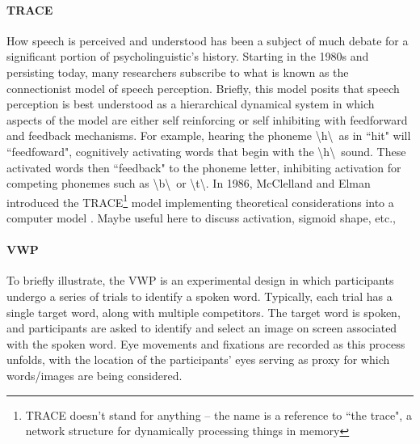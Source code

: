 \documentclass{article}
\begin{document}
\paragraph{TRACE } How speech is perceived and understood has been a subject of much debate for a significant portion of psycholinguistic's history. Starting in the 1980s and persisting today, many researchers subscribe to what is known as the connectionist model of speech perception. Briefly, this model posits that speech perception is best understood as a hierarchical dynamical system in which aspects of the model are either self reinforcing or self inhibiting with feedforward and feedback mechanisms. For example, hearing the phoneme \textbackslash h\textbackslash  \ as in ``hit" will ``feedfoward", cognitively activating words that begin with the \textbackslash h\textbackslash \  sound. These activated words then ``feedback" to the phoneme letter, inhibiting activation for competing phonemes such as \textbackslash b\textbackslash \ or \textbackslash t\textbackslash. In 1986, McClelland and Elman introduced the TRACE\footnote{TRACE doesn't stand for anything -- the name is a reference to ``the trace", a network structure for dynamically processing things in memory} model implementing theoretical considerations into a computer model \cite{elman1985speech}. Maybe useful here to discuss activation, sigmoid shape, etc., 

\paragraph{VWP} To briefly illustrate, the VWP is an experimental design in which participants undergo a series of trials to identify a spoken word. Typically, each trial has a single target word, along with multiple competitors. The target word is spoken, and participants are asked to identify and select an image on screen associated with the spoken word. Eye movements and fixations are recorded as this process unfolds, with the location of the participants' eyes serving as proxy for which words/images are being considered. 
\end{document}

